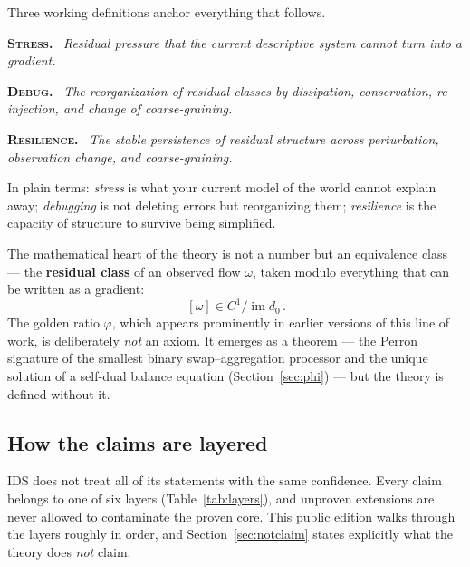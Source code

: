 \documentclass[11pt,a4paper]{article}
\newenvironment{defbox}[1]{\begin{mdframed}[style=canon]\textbf{\textsc{#1}.}\ \itshape}{\end{mdframed}}
\theoremstyle{plain}
\begin{document}
Three working definitions anchor everything that follows.

\begin{defbox}{Stress}
Residual pressure that the current descriptive system cannot turn into a gradient.
\end{defbox}

\begin{defbox}{Debug}
The reorganization of residual classes by dissipation, conservation, re-injection, and change of coarse-graining.
\end{defbox}

\begin{defbox}{Resilience}
The stable persistence of residual structure across perturbation, observation change, and coarse-graining.
\end{defbox}

In plain terms: \emph{stress} is what your current model of the world cannot explain away; \emph{debugging} is not deleting errors but reorganizing them; \emph{resilience} is the capacity of structure to survive being simplified.

The mathematical heart of the theory is not a number but an equivalence class --- the \textbf{residual class} of an observed flow $\omega$, taken modulo everything that can be written as a gradient:
\begin{equation}
\boxed{\,[\omega]\in C^1/\operatorname{im}d_0\,.}
\label{eq:heart}
\end{equation}
The golden ratio $\varphi$, which appears prominently in earlier versions of this line of work, is deliberately \emph{not} an axiom. It emerges as a theorem --- the Perron signature of the smallest binary swap--aggregation processor and the unique solution of a self-dual balance equation (Section~\ref{sec:phi}) --- but the theory is defined without it.

\subsection{How the claims are layered}

IDS does not treat all of its statements with the same confidence. Every claim belongs to one of six layers (Table~\ref{tab:layers}), and unproven extensions are never allowed to contaminate the proven core. This public edition walks through the layers roughly in order, and Section~\ref{sec:notclaim} states explicitly what the theory does \emph{not} claim.
\end{document}
